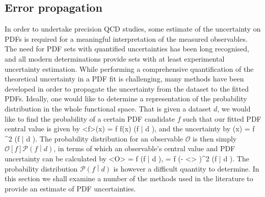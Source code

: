 \subsection{Error propagation}
\label{sec:errors}
In order to undertake precision QCD studies, some estimate of the uncertainty on PDFs is required for a meaningful interpretation of the measured observables. The need for PDF sets with quantified uncertainties has been long recognised, and all modern determinations provide sets with at least experimental uncertainty estimation. While performing a comprehensive quantification of the theoretical uncertainty in a PDF fit is challenging, many methods have been developed in order to propagate the uncertainty from the dataset to the fitted PDFs. Ideally, one would like to determine a representation of the probability distribution in the whole functional space. That is given a dataset ${d}$, we would like to find the probability of a certain PDF candidate $f$ such that our fitted PDF central value is given by
\be \left<f\right>\left(x\right) = \int {}f \;f\left(x\right)  \left(f \middle| d \right), \ee
and the uncertainty by
\be {}\left[f\right]\left(x\right) = \int {} f \; ^2   \left(f \middle| d \right). \ee
The probability distribution for an observable $\mathcal{O}$ is then simply $\mathcal{O}\left[f\right]\mathcal{P}\left(f \middle| d \right)$, in terms of which an observable's central
value and PDF uncertainty can be calculated by
\be \left<O\right> = \int {}f \; \left[f\right]  \left(f \middle| d \right), \ee
\be {} =  \int {}f \; \left(\left[f\right] - \left<\right> \right)^2 \;\left(f \middle| d \right). \ee
The probability distribution $\mathcal{P}\left(f \middle| d \right)$ is however a difficult quantity to determine. In this section we shall examine a number of the methods used in the literature to provide an estimate of PDF uncertainties.
